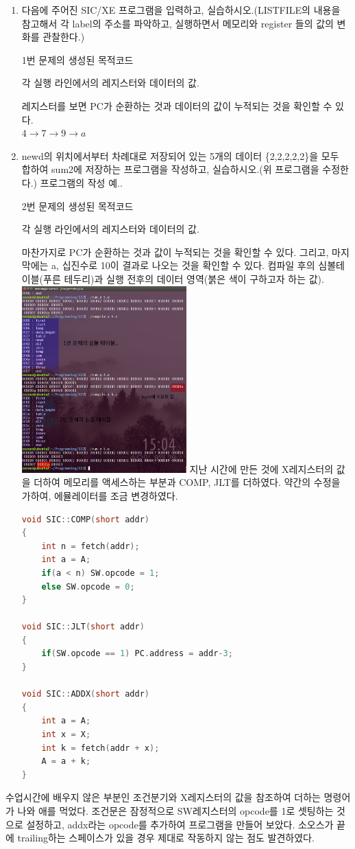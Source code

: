 \documentclass[11pt,a4paper,twocolumn,landscape]{article}
\begin{document}
\begin{enumerate}


\lstset{language=[x86masm]Assembler}
\item 다음에 주어진 SIC/XE 프로그램을 입력하고, 실습하시오.(LISTFILE의 내용을 참고해서 각 label의 주소를 파악하고, 실행하면서 메모리와 register 들의 값의 변화를 관찰한다.)



1번 문제의 생성된 목적코드

각 실행 라인에서의 레지스터와 데이터의 값.

레지스터를 보면 PC가 순환하는 것과 데이터의 값이 누적되는 것을 확인할 수 있다.\\
$4\rightarrow 7\rightarrow 9\rightarrow a$
\\
\item newd의 위치에서부터 차례대로 저장되어 있는 5개의 데이터 \{2,2,2,2,2\}을 모두 합하여 sum2에 저장하는 프로그램을 작성하고, 실습하시오.(위 프로그램을 수정한다.)
프로그램의 작성 예..


2번 문제의 생성된 목적코드 

각 실행 라인에서의 레지스터와 데이터의 값.

마찬가지로 PC가 순환하는 것과 값이 누적되는 것을 확인할 수 있다. 그리고, 마지막에는 a, 십진수로 10이 결과로 나오는 것을 확인할 수 있다.
\newpage
컴파일 후의 심볼테이블(푸른 테두리)과 실행 전후의 데이터 영역(붉은 색이 구하고자 하는 값).\\
\vspace{1cm}
\includegraphics[width=0.5\textwidth]{2.png}
		\lstset{language=C}
\newpage
지난 시간에 만든 것에 X레지스터의 값을 더하여 메모리를 액세스하는 부분과 COMP, JLT를 더하였다.
약간의 수정을 가하여, 에뮬레이터를 조금 변경하였다.

\begin{lstlisting}[language=C++]
void SIC::COMP(short addr) 
{
	int n = fetch(addr);
	int a = A;
	if(a < n) SW.opcode = 1;
	else SW.opcode = 0;
}

void SIC::JLT(short addr) 
{
	if(SW.opcode == 1) PC.address = addr-3;
}

void SIC::ADDX(short addr)
{
	int a = A;
	int x = X;
	int k = fetch(addr + x);
	A = a + k;
}

\end{lstlisting}


\end{enumerate}

{}
\indent
수업시간에 배우지 않은 부분인 조건분기와 X레지스터의 값을 참조하여 더하는 명령어가 나와 애를 먹었다.
조건문은 잠정적으로 SW레지스터의 opcode를 1로 셋팅하는 것으로 설정하고, addx라는 opcode를 추가하여 프로그램을 만들어 보았다. 
소오스가 끝에 trailing하는 스페이스가 있을 경우 제대로 작동하지 않는 점도 발견하였다. 
\end{document}
